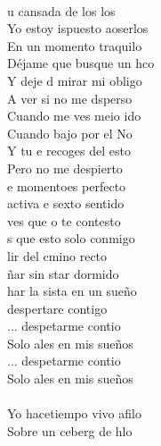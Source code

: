 \begin{cancion}[Despertar][Estopa]%
	             \\
	   u cansada de los los\\
	 Yo estoy ispuesto aoserlos\\
	    En un momento traquilo\\
	Déjame que busque un hco\\
	Y deje d mirar mi obligo\\
	   A ver si no me dsperso\\
	    Cuando me ves meio ido\\
	Cuando bajo por el No\\
	Y tu e recoges del esto\\
	    Pero no me despierto\\
	\jump
	e momentoes perfecto\\
	 activa e sexto sentido\\
	 ves que o te contesto\\
	s que esto solo conmigo\\
	lir del cmino recto\\
	ñar sin star dormido\\
	har la sista en un sueño\\
	 despertare contigo\\
	\jump
	... despetarme contio\\
	Solo ales en mis sueños\\
	... despetarme contio\\
	Solo ales en mis sueños\\
	\jump
	        \\
	\jump
	\jump
	  Yo hacetiempo vivo afilo\\
	  Sobre un ceberg de hlo\\

\end{cancion}
